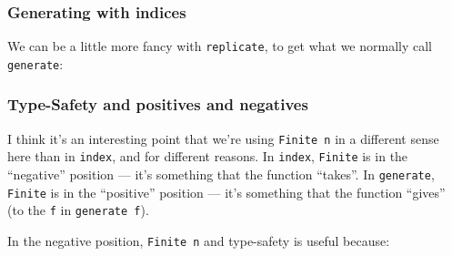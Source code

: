 \documentclass[]{article}
\newenvironment{Shaded}{}{}
\newcommand{\CommentTok}[1]{\textcolor[rgb]{0.38,0.63,0.69}{\textit{#1}}}
\newcommand{\DataTypeTok}[1]{\textcolor[rgb]{0.56,0.13,0.00}{#1}}
\newcommand{\FunctionTok}[1]{\textcolor[rgb]{0.02,0.16,0.49}{#1}}
\newcommand{\KeywordTok}[1]{\textcolor[rgb]{0.00,0.44,0.13}{\textbf{#1}}}
\newcommand{\NormalTok}[1]{#1}
\newcommand{\OperatorTok}[1]{\textcolor[rgb]{0.40,0.40,0.40}{#1}}
\newcommand{\OtherTok}[1]{\textcolor[rgb]{0.00,0.44,0.13}{#1}}
\begin{document}
\subsubsection{Generating with indices}\label{generating-with-indices}

We can be a little more fancy with \texttt{replicate}, to get what we normally
call \texttt{generate}:

\begin{Shaded}
\end{Shaded}

\subsubsection{Type-Safety and positives and
negatives}\label{type-safety-and-positives-and-negatives}

I think it's an interesting point that we're using \texttt{Finite\ n} in a
different sense here than in \texttt{index}, and for different reasons. In
\texttt{index}, \texttt{Finite} is in the ``negative'' position --- it's
something that the function ``takes''. In \texttt{generate}, \texttt{Finite} is
in the ``positive'' position --- it's something that the function ``gives'' (to
the \texttt{f} in \texttt{generate\ f}).

In the negative position, \texttt{Finite\ n} and type-safety is useful because:
\end{document}

